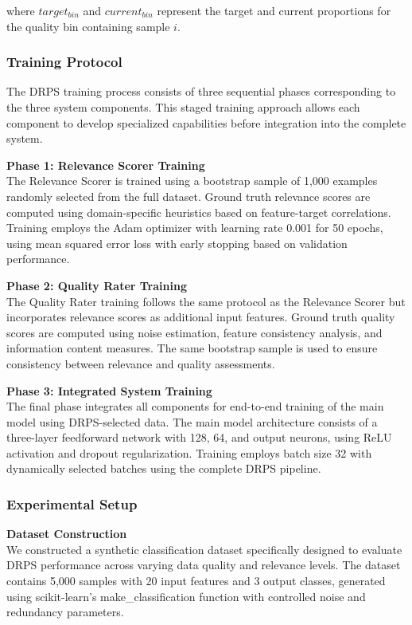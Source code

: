 \documentclass[12pt]{article}
\begin{document}
where $target_{bin}$ and $current_{bin}$ represent the target and current proportions for the quality bin containing sample $i$.

\subsubsection{Training Protocol}\label{training-protocol}

The DRPS training process consists of three sequential phases corresponding to the three system components. This staged training approach allows each component to develop specialized capabilities before integration into the complete system.

\textbf{Phase 1: Relevance Scorer Training} \\
The Relevance Scorer is trained using a bootstrap sample of 1,000 examples randomly selected from the full dataset. Ground truth relevance scores are computed using domain-specific heuristics based on feature-target correlations. Training employs the Adam optimizer with learning rate 0.001 for 50 epochs, using mean squared error loss with early stopping based on validation performance.

\textbf{Phase 2: Quality Rater Training} \\
The Quality Rater training follows the same protocol as the Relevance Scorer but incorporates relevance scores as additional input features. Ground truth quality scores are computed using noise estimation, feature consistency analysis, and information content measures. The same bootstrap sample is used to ensure consistency between relevance and quality assessments.

\textbf{Phase 3: Integrated System Training} \\
The final phase integrates all components for end-to-end training of the main model using DRPS-selected data. The main model architecture consists of a three-layer feedforward network with 128, 64, and output neurons, using ReLU activation and dropout regularization. Training employs batch size 32 with dynamically selected batches using the complete DRPS pipeline.

\subsubsection{Experimental Setup}\label{experimental-setup}

\textbf{Dataset Construction} \\
We constructed a synthetic classification dataset specifically designed to evaluate DRPS performance across varying data quality and relevance levels. The dataset contains 5,000 samples with 20 input features and 3 output classes, generated using scikit-learn's make\_classification function with controlled noise and redundancy parameters.
\end{document}
